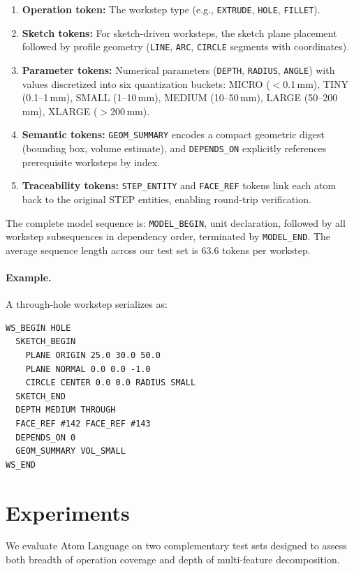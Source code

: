 \documentclass{styles/svproc}
\begin{document}
\begin{enumerate}
\item \textbf{Operation token:} The workstep type (e.g., \texttt{EXTRUDE}, \texttt{HOLE}, \texttt{FILLET}).
\item \textbf{Sketch tokens:} For sketch-driven worksteps, the sketch plane placement followed by profile geometry (\texttt{LINE}, \texttt{ARC}, \texttt{CIRCLE} segments with coordinates).
\item \textbf{Parameter tokens:} Numerical parameters (\texttt{DEPTH}, \texttt{RADIUS}, \texttt{ANGLE}) with values discretized into six quantization buckets: MICRO ($<$0.1\,mm), TINY (0.1--1\,mm), SMALL (1--10\,mm), MEDIUM (10--50\,mm), LARGE (50--200\,mm), XLARGE ($>$200\,mm).
\item \textbf{Semantic tokens:} \texttt{GEOM\_SUMMARY} encodes a compact geometric digest (bounding box, volume estimate), and \texttt{DEPENDS\_ON} explicitly references prerequisite worksteps by index.
\item \textbf{Traceability tokens:} \texttt{STEP\_ENTITY} and \texttt{FACE\_REF} tokens link each atom back to the original STEP entities, enabling round-trip verification.
\end{enumerate}

The complete model sequence is: \texttt{MODEL\_BEGIN}, unit declaration, followed by all workstep subsequences in dependency order, terminated by \texttt{MODEL\_END}. The average sequence length across our test set is 63.6 tokens per workstep.

\paragraph{Example.} A through-hole workstep serializes as:
\begin{lstlisting}[basicstyle=\ttfamily\scriptsize, frame=single, xleftmargin=2em]
WS_BEGIN HOLE
  SKETCH_BEGIN
    PLANE ORIGIN 25.0 30.0 50.0
    PLANE NORMAL 0.0 0.0 -1.0
    CIRCLE CENTER 0.0 0.0 RADIUS SMALL
  SKETCH_END
  DEPTH MEDIUM THROUGH
  FACE_REF #142 FACE_REF #143
  DEPENDS_ON 0
  GEOM_SUMMARY VOL_SMALL
WS_END
\end{lstlisting}

\section{Experiments}
\label{sec:experiments}
We evaluate Atom Language on two complementary test sets designed to assess both breadth of operation coverage and depth of multi-feature decomposition.
\end{document}
